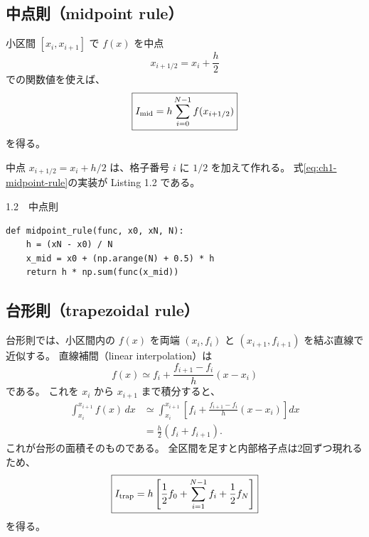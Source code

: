 \subsection{中点則（midpoint rule）}

小区間 $[x_i,x_{i+1}]$ で $f(x)$ を中点
\begin{equation}
 x_{i+1/2}=x_i+\frac{h}{2}
\label{eq:ch1-midpoint-def}
\end{equation}
での関数値を使えば、
\begin{equation}
 \boxed{
 I_{\rm mid}
 =h\sum_{i=0}^{N-1}f(x_{i+1/2})
 }
\label{eq:ch1-midpoint-rule}
\end{equation}
を得る。

中点 $x_{i+1/2}=x_i+h/2$ は、格子番号 $i$ に $1/2$ を加えて作れる。
式\eqref{eq:ch1-midpoint-rule}の実装が Listing 1.2 である。
\begin{listingbox}{1.2　中点則}
\begin{Verbatim}[fontsize=\small]
def midpoint_rule(func, x0, xN, N):
    h = (xN - x0) / N
    x_mid = x0 + (np.arange(N) + 0.5) * h
    return h * np.sum(func(x_mid))
\end{Verbatim}
\end{listingbox}


\subsection{台形則（trapezoidal rule）}

台形則では、小区間内の $f(x)$ を両端 $(x_i,f_i)$ と $(x_{i+1},f_{i+1})$ を結ぶ直線で近似する。
直線補間（linear interpolation）は
\begin{equation}
 f(x)
 \simeq f_i
 +\frac{f_{i+1}-f_i}{h}(x-x_i)
\label{eq:ch1-linear-interpolation}
\end{equation}
である。
これを $x_i$ から $x_{i+1}$ まで積分すると、
\begin{align}
 \int_{x_i}^{x_{i+1}}f(x)\,dx
 &\simeq
 \int_{x_i}^{x_{i+1}}
 \left[
 f_i+\frac{f_{i+1}-f_i}{h}(x-x_i)
 \right]dx \\
 &=\frac{h}{2}(f_i+f_{i+1}).
\label{eq:ch1-trapezoid-panel}
\end{align}
これが台形の面積そのものである。
全区間を足すと内部格子点は2回ずつ現れるため、
\begin{equation}
 \boxed{
 I_{\rm trap}
 =h\left[
 \frac{1}{2}f_0
 +\sum_{i=1}^{N-1}f_i
 +\frac{1}{2}f_N
 \right]
 }
\label{eq:ch1-trapezoid-rule}
\end{equation}
を得る。


